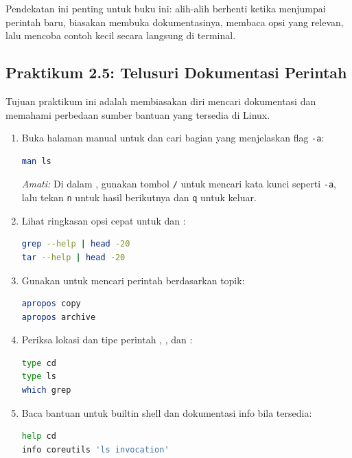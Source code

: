 Pendekatan ini penting untuk buku ini: alih-alih berhenti ketika menjumpai perintah baru, biasakan membuka dokumentasinya, membaca opsi yang relevan, lalu mencoba contoh kecil secara langsung di terminal.

\subsection*{Praktikum 2.5: Telusuri Dokumentasi Perintah}

Tujuan praktikum ini adalah membiasakan diri mencari dokumentasi dan memahami perbedaan sumber bantuan yang tersedia di Linux.

\begin{enumerate}
    \item Buka halaman manual untuk  dan cari bagian yang menjelaskan flag \texttt{-a}:
\begin{lstlisting}[language=bash, caption={Membuka halaman manual}]
man ls
\end{lstlisting}
    \textit{Amati:} Di dalam , gunakan tombol \texttt{/} untuk mencari kata kunci seperti \texttt{-a}, lalu tekan \texttt{n} untuk hasil berikutnya dan \texttt{q} untuk keluar.

    \item Lihat ringkasan opsi cepat untuk  dan :
\begin{lstlisting}[language=bash, caption={Ringkasan bantuan cepat}]
grep --help | head -20
tar --help | head -20
\end{lstlisting}

    \item Gunakan  untuk mencari perintah berdasarkan topik:
\begin{lstlisting}[language=bash, caption={Mencari perintah berdasarkan kata kunci}]
apropos copy
apropos archive
\end{lstlisting}

    \item Periksa lokasi dan tipe perintah , , dan :
\begin{lstlisting}[language=bash, caption={Mengenali jenis perintah di shell}]
type cd
type ls
which grep
\end{lstlisting}

    \item Baca bantuan untuk builtin shell dan dokumentasi info bila tersedia:
\begin{lstlisting}[language=bash, caption={Bantuan builtin dan info}]
help cd
info coreutils 'ls invocation'
\end{lstlisting}
\end{enumerate}

